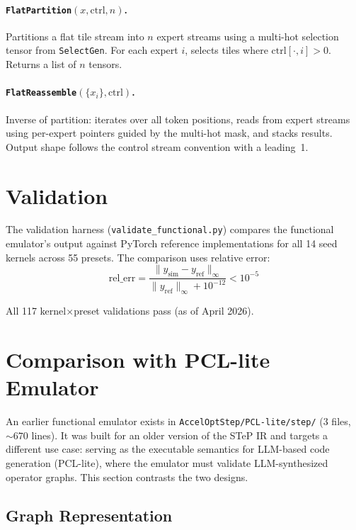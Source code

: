 \documentclass[11pt]{article}
\begin{document}
\paragraph{\texttt{FlatPartition}$(x, \text{ctrl}, n)$.}
Partitions a flat tile stream into $n$ expert streams using a multi-hot selection tensor from \texttt{SelectGen}.
For each expert $i$, selects tiles where $\text{ctrl}[\cdot, i] > 0$.
Returns a list of $n$ tensors.

\paragraph{\texttt{FlatReassemble}$(\{x_i\}, \text{ctrl})$.}
Inverse of partition: iterates over all token positions, reads from expert streams using per-expert pointers guided by the multi-hot mask, and stacks results.
Output shape follows the control stream convention with a leading~1.

\section{Validation}

The validation harness (\texttt{validate\_functional.py}) compares the functional emulator's output against PyTorch reference implementations for all 14 seed kernels across 55 presets.
The comparison uses relative error:
\[
  \text{rel\_err} = \frac{\|y_{\text{sim}} - y_{\text{ref}}\|_\infty}{\|y_{\text{ref}}\|_\infty + 10^{-12}} < 10^{-5}
\]

All 117 kernel$\times$preset validations pass (as of April 2026).

\section{Comparison with PCL-lite Emulator}

An earlier functional emulator exists in \texttt{AccelOptStep/PCL-lite/step/} (3 files, ${\sim}670$ lines).
It was built for an older version of the STeP IR and targets a different use case: serving as the executable semantics for LLM-based code generation (PCL-lite), where the emulator must validate LLM-synthesized operator graphs.
This section contrasts the two designs.

\subsection{Graph Representation}
\end{document}
